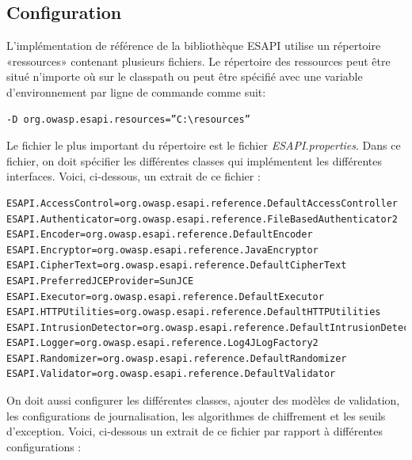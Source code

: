 \subsection{Configuration}
L'implémentation de référence de la bibliothèque ESAPI utilise un répertoire «ressources» contenant plusieurs fichiers. Le répertoire des ressources peut être situé n’importe où sur le classpath ou peut être spécifié avec une variable d’environnement par ligne de commande comme suit: 
\begin{verbatim}
-D org.owasp.esapi.resources=”C:\resources” 
\end{verbatim}
Le fichier le plus important du répertoire est le fichier \textit{ESAPI.properties}. Dans ce fichier, on doit spécifier les différentes classes qui implémentent les différentes interfaces. Voici, ci-dessous, un extrait de ce fichier :
\lstset{language=Python}
\begin{lstlisting}
ESAPI.AccessControl=org.owasp.esapi.reference.DefaultAccessController
ESAPI.Authenticator=org.owasp.esapi.reference.FileBasedAuthenticator2
ESAPI.Encoder=org.owasp.esapi.reference.DefaultEncoder
ESAPI.Encryptor=org.owasp.esapi.reference.JavaEncryptor
ESAPI.CipherText=org.owasp.esapi.reference.DefaultCipherText
ESAPI.PreferredJCEProvider=SunJCE
ESAPI.Executor=org.owasp.esapi.reference.DefaultExecutor
ESAPI.HTTPUtilities=org.owasp.esapi.reference.DefaultHTTPUtilities
ESAPI.IntrusionDetector=org.owasp.esapi.reference.DefaultIntrusionDetector
ESAPI.Logger=org.owasp.esapi.reference.Log4JLogFactory2
ESAPI.Randomizer=org.owasp.esapi.reference.DefaultRandomizer
ESAPI.Validator=org.owasp.esapi.reference.DefaultValidator
\end{lstlisting}
On doit aussi configurer les différentes classes, ajouter des modèles de validation, les configurations de journalisation, les algorithmes de chiffrement et les seuils d'exception. Voici, ci-dessous un extrait de ce fichier par rapport à différentes configurations :
